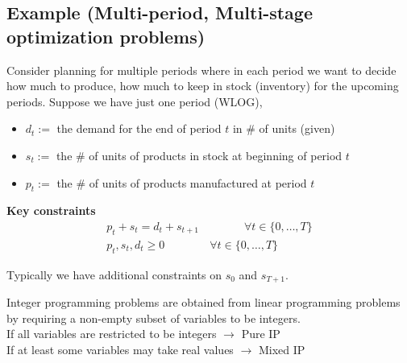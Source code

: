 \subsection{Example (Multi-period, Multi-stage optimization problems)}
Consider planning for multiple periods where in each period we
want to decide how much to produce, how much to keep in stock
(inventory) for the upcoming periods. Suppose we have just one period
(WLOG),
\begin{itemize}
    \item $d_t:=$ the demand for the end of period $t$ in \# of units (given)
    \item $s_t:=$ the \# of units of products in stock at beginning of period $t$
    \item $p_t:=$ the \# of units of products manufactured at period $t$
\end{itemize}
\textbf{Key constraints}
\begin{align*}
    p_t+s_t=d_t+s_{t+1} \qquad\qquad \forall t\in \{0,\dots,T\}\\
    p_t,s_t,d_t\ge 0 \qquad\qquad \forall t\in \{0,\dots,T\}
\end{align*}
\begin{remark}
    Typically we have additional constraints on $s_0$ and $s_{T+1}$.
\end{remark}
\begin{remark}
    Integer programming problems are obtained from linear programming 
    problems by requiring a non-empty subset of variables to be integers.\\
    If all variables are restricted to be integers $\rightarrow$ Pure IP\\
    If at least some variables may take real values $\rightarrow$ Mixed IP
\end{remark}